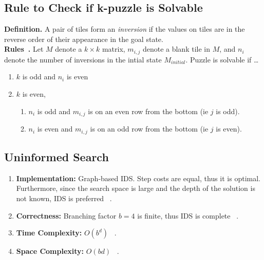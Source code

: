 \documentclass[runningheads]{llncs}
\begin{document}
\subsection{Rule to Check if k-puzzle is Solvable}
\textbf{Definition.} A pair of tiles form an \textit{inversion} if the values on tiles are in the reverse order of their appearance in the goal state. \\
\textbf{Rules~\cite{aditya_goel_how_nodate}.} Let \( M \) denote a \( k \times k \) matrix, \( m_{i, j} \) denote a blank tile in \( M \), and \( n_i \) denote the number of inversions in the intial state \( M_{initial} \). Puzzle is solvable if \dots
\begin{enumerate}
    \item \( k \) is odd and \( n_i \) is even
    \item \( k \) is even,
    \begin{enumerate}
        \item \( n_i \) is odd and \( m_{i,j} \) is on an even row from the bottom (ie \( j \) is odd).
        \item \( n_i \) is even and \( m_{i,j} \) is on an odd row from the bottom (ie \( j \) is even).
    \end{enumerate}
\end{enumerate}

\subsection{Uninformed Search}
\begin{enumerate}
    \item \textbf{Implementation:} Graph-based IDS. Step costs are equal, thus it is optimal. Furthermore, since the search space is large and the depth of the solution is not known, IDS is preferred ~\cite[p90]{stuart_russell_artifical_2010}.
    \item \textbf{Correctness:} Branching factor \( b = 4 \) is finite, thus IDS is complete ~\cite[p88-90]{stuart_russell_artifical_2010}. 
    \item \textbf{Time Complexity:} \( O(b^d) \) ~\cite[p88-90]{stuart_russell_artifical_2010}.
    \item \textbf{Space Complexity:} \( O(bd) \) ~\cite[p88-90]{stuart_russell_artifical_2010}.
\end{enumerate}

\end{document}
